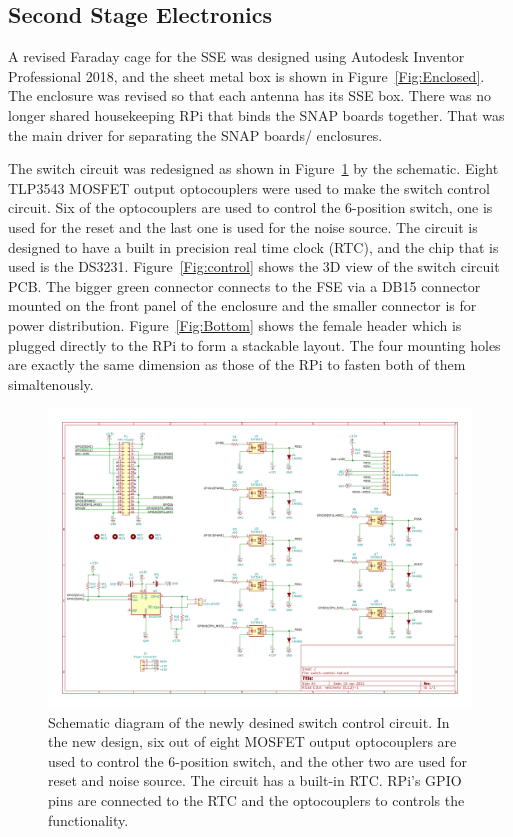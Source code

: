 \subsection{Second Stage Electronics}

A revised Faraday cage for the SSE was designed using Autodesk Inventor Professional 2018, and the sheet metal box is shown in Figure~\ref{Fig:Enclosed}. The enclosure was revised so that each antenna has its SSE box.  There was no longer shared housekeeping RPi that binds the SNAP boards together. That was the main driver for separating the SNAP boards/ enclosures.

The switch circuit was redesigned as shown in Figure~\ref{Fig:newcontrol} by the schematic. Eight TLP3543 MOSFET output optocouplers were used to make the switch control circuit. Six of the optocouplers are used to control the 6-position switch, one is used for the reset and the last one is used for the noise source. The circuit is designed to have a built in precision real time clock (RTC), and the chip that is used is the DS3231. Figure~\ref{Fig:control} shows the 3D view of the switch circuit PCB. The bigger green connector connects to the FSE via a DB15 connector mounted on the front panel of the enclosure and the smaller connector is for power distribution. Figure~\ref{Fig:Bottom} shows the female header which is plugged directly to the RPi to form a stackable layout. The four mounting holes are exactly the same dimension as those of the RPi to fasten both of them simaltenously.

\begin{figure}
	\centering
	\includegraphics[width=\linewidth]{"Figures/new control"}
	\caption{Schematic diagram of the newly desined switch control circuit. In the new design, six out of eight MOSFET output optocouplers are used to control the 6-position switch, and the other two are used for reset and noise source. The circuit has a built-in RTC. RPi's GPIO pins are connected to the RTC and the optocouplers to controls the functionality.}
	\label{Fig:newcontrol}
\end{figure}



